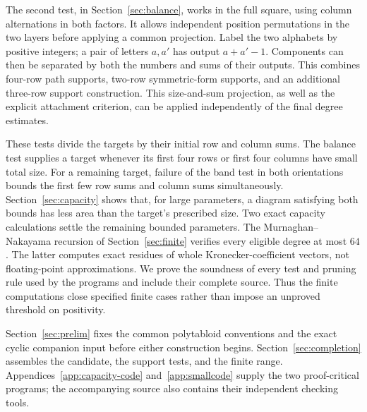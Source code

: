 The second test, in Section~\ref{sec:balance}, works in the full square,
using column alternations in both factors. It allows independent
position permutations in the two layers before applying a common
projection. Label the two alphabets by positive integers; a pair of
letters $a,a'$ has output $a+a'-1$. Components can then be separated
by both the numbers and sums of their outputs.
This combines four-row path supports, two-row
symmetric-form supports, and an additional three-row support
construction. This
size-and-sum projection, as well as the explicit attachment criterion,
can be applied independently of the final degree estimates.

These tests divide the targets by their initial row and column sums.
The balance test supplies a target whenever its first four rows or first
four columns have small total size. For a remaining target, failure of
the band test in both orientations bounds the first few row sums and
column sums simultaneously. Section~\ref{sec:capacity} shows that, for
large parameters, a diagram satisfying both bounds has less area than
the target's prescribed size. Two exact capacity calculations settle
the remaining bounded parameters. The Murnaghan--Nakayama recursion of
Section~\ref{sec:finite}
verifies every eligible degree at most $64$. The latter computes exact
residues of whole Kronecker-coefficient vectors, not floating-point
approximations. We prove the soundness of every test and pruning rule
used by the programs and include their complete source. Thus the finite
computations close specified finite cases rather than impose an
unproved threshold on positivity.

Section~\ref{sec:prelim} fixes the common polytabloid conventions and the
exact cyclic companion input before either construction begins.
Section~\ref{sec:completion} assembles the candidate, the support tests,
and the finite range. Appendices~\ref{app:capacity-code}
and~\ref{app:smallcode} supply the two proof-critical programs; the
accompanying source also contains their independent checking tools.
